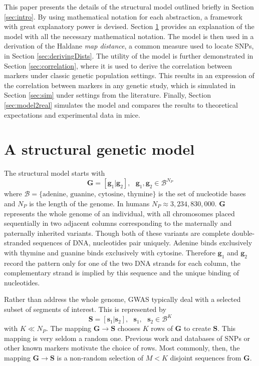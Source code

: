 \documentclass[12pt]{article}
\newcommand{\ve}[1]{\mathbf{#1}}           %
\newcommand{\m}[1]{\mathbf{#1}}               %
\begin{document}
This paper presents the details of the structural model outlined briefly in Section \ref{sec:intro}. By using mathematical notation for each abstraction, a framework with great explanatory power is devised. Section \ref{sec:theModel} provides an explanation of the model with all the necessary mathematical notation. The model is then used in a derivation of the Haldane \emph{map distance}, a common measure used to locate SNPs, in Section \ref{sec:derivingDists}. The utility of the model is further demonstrated in Section \ref{sec:correlation}, where it is used to derive the correlation between markers under classic genetic population settings. This results in an expression of the correlation between markers in any genetic study, which is simulated in Section \ref{sec:sim} under settings from the literature. Finally, Section \ref{sec:model2real} simulates the model and compares the results to theoretical expectations and experimental data in mice.

\section{A structural genetic model} \label{sec:theModel}

The structural model starts with
$$\m{G} = [\ve{g}_1| \ve{g}_2], \text{ } \ve{g}_1, \ve{g}_2 \in \mathcal{B}^{N_P}$$
where $\mathcal{B} = \{\text{adenine, guanine, cytosine, thymine}\}$ is the set of nucleotide bases and $N_P$ is the length of the genome. In humans $N_P \approx 3,234,830,000$. $\m{G}$ represents the whole genome of an individual, with all chromosomes placed sequentially in two adjacent columns corresponding to the maternally and paternally inherited variants. Though both of these variants are complete double-stranded sequences of DNA, nucleotides pair uniquely. Adenine binds exclusively with thymine and guanine binds exclusively with cytosine. Therefore $\ve{g}_1$ and $\ve{g}_2$ record the pattern only for one of the two DNA strands for each column, the complementary strand is implied by this sequence and the unique binding of nucleotides.

Rather than address the whole genome, GWAS typically deal with a selected subset of segments of interest. This is represented by
$$\m{S} = [\ve{s}_1 | \ve{s}_2], \text{ } \ve{s}_1, \text{ } \ve{s}_2 \in \mathcal{B}^K$$
with $K \ll N_P$. The mapping $\m{G} \rightarrow \m{S}$ chooses $K$ rows of $\m{G}$ to create $\m{S}$. This mapping is very seldom a random one. Previous work and databases of SNPs or other known markers motivate the choice of rows. Most commonly, then, the mapping $\m{G} \rightarrow \m{S}$ is a non-random selection of $M < K$ disjoint sequences from $\m{G}$.
\end{document}
